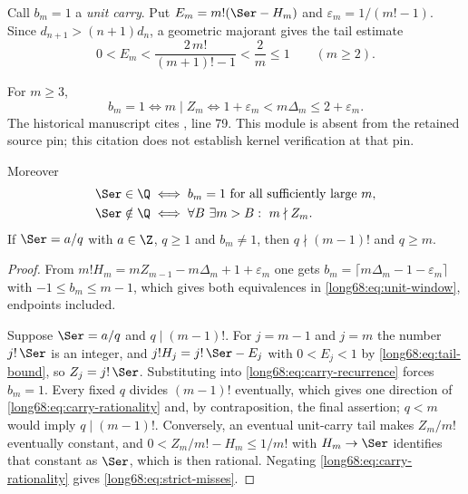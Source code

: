 Call $b_m=1$ a \emph{unit carry}.  Put
$E_m=m!(\Ser-H_m)$ and $\varepsilon_m=1/(m!-1)$.  Since
$d_{n+1}>(n+1)d_n$, a geometric majorant gives the tail estimate
\begin{equation}\label{long68:eq:tail-bound}
 0<E_m<\frac{2\,m!}{(m+1)!-1}<\frac2m\le1\qquad(m\ge2).
\end{equation}

\label{long68:res:lead-carry-equivalence}
\label{long68:res:strict-successor-complete-characterization}
\begin{theorem}\label{long68:res:carry-equivalence}
For $m\ge3$,
\begin{equation}\label{long68:eq:unit-window}
 b_m=1
 \iff m\mid Z_m
 \iff 1+\varepsilon_m<m\Delta_m\le2+\varepsilon_m .
\end{equation}
  The historical manuscript cites , line 79. This module is absent from the retained source pin; this citation does not establish kernel verification at that pin.

Moreover
\begin{align}
 \Ser\in\Q
 &\iff b_m=1\ \hbox{for all sufficiently large }m,
 \label{long68:eq:carry-rationality}\\
 \Ser\notin\Q
 &\iff \forall B\ \exists m>B:\ m\nmid Z_m .
 \label{long68:eq:strict-misses}
\end{align}
If $\Ser=a/q$ with $a\in\Z$, $q\ge1$ and $b_m\ne1$, then $q\nmid(m-1)!$ and
$q\ge m$.
\end{theorem}

\begin{proof}
From $m!H_m=mZ_{m-1}-m\Delta_m+1+\varepsilon_m$ one gets
$b_m=\lceil m\Delta_m-1-\varepsilon_m\rceil$ with $-1\le b_m\le m-1$, which
gives both equivalences in \eqref{long68:eq:unit-window}, endpoints included.

Suppose $\Ser=a/q$ and $q\mid(m-1)!$.  For $j=m-1$ and $j=m$ the number
$j!\,\Ser$ is an integer, and $j!H_j=j!\,\Ser-E_j$ with $0<E_j<1$ by
\eqref{long68:eq:tail-bound}, so $Z_j=j!\,\Ser$.  Substituting into
\eqref{long68:eq:carry-recurrence} forces $b_m=1$.  Every fixed $q$ divides
$(m-1)!$ eventually, which gives one direction of
\eqref{long68:eq:carry-rationality} and, by contraposition, the final assertion;
$q<m$ would imply $q\mid(m-1)!$.  Conversely, an eventual unit-carry tail
makes $Z_m/m!$ eventually constant, and $0<Z_m/m!-H_m\le1/m!$ with
$H_m\to\Ser$ identifies that constant as $\Ser$, which is then rational.
Negating \eqref{long68:eq:carry-rationality} gives \eqref{long68:eq:strict-misses}.
\end{proof}

